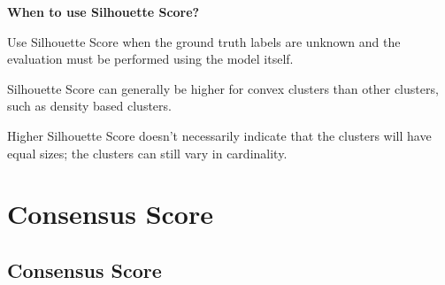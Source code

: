 \textbf{When to use Silhouette Score?}

Use Silhouette Score when the ground truth labels are unknown and the evaluation must be performed using the model itself.

{
\item Silhouette Score can generally be higher for convex clusters than other clusters, such as density based clusters.
\item Higher Silhouette Score doesn't necessarily indicate that the clusters will have equal sizes; the clusters can still vary in cardinality. 
}

\clearpage
\thispagestyle{clusteringstyle}
\section{ Consensus Score}
\subsection{ Consensus Score}
